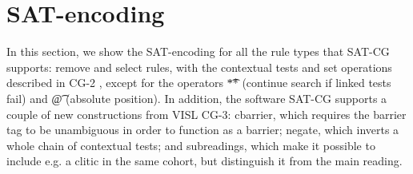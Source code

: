 \def\sobre{\text{\em sobre}}
\def\una{\text{\em una}}
\def\aproximacion{\text{ \em aproximaci\'{o}n}}
\def\mas{\text{\em m\'{a}s}}
\def\cientifica{\text{\em cient\'{\i}fica}}


\def\vPrsPThree{\text{\sc PrsP3}}
\def\vPrsPOne{\text{\sc PrsP1}}
\def\vImpPThree{\text{\sc ImpP3}}
\def\adj{{\text{\sc Adj}}}
\def\adv{{\text{\sc Adv}}}
\def\n{\text{\sc N}}
\def\pr{{\text{\sc Pr}}}
\def\prn{{\text{\sc Prn}}}
\def\det{{\text{\sc Det}}}
\def\notDet{{\neg \text{\sc Det}}}
\def\any{{\text{Any}}}


\def\sobrePr{\sobre_\pr}
\def\sobreN{\sobre_\n}

\def\unaNotDet{\una_\notDet}
\def\unaAny{\una_\any}
\def\unaPrn{\una_\prn}
\def\unaDet{\una_\det}
\def\unaPrsPThree{\una_\vPrsPThree}
\def\unaPrsPOne{\una_\vPrsPOne}
\def\unaImp{\una_\vImpPThree}
\def\aproximacionN{\aproximacion_\n}
\def\masAdv{\mas_\adv}
\def\masAdj{\mas_\adj}
\def\cientificaAdj{\cientifica_\adj}
\def\cientificaN{\cientifica_\n}


\def\newVar{\text{}} %

\def\cgrule#1{\noindent {\bf  #1 }}
\def\eqdef{\Coloneqq}
\def\impl{\quad\Longrightarrow\quad}

\def\ob#1{\overbrace{ #1 \rule{0pt}{2ex}}}





\section{SAT-encoding}
\label{sec:encoding}

\noindent In this section, we show the SAT-encoding for all the rule types that
SAT-CG supports:
{\sc remove} and {\sc select} rules, with the contextual tests and set operations described in CG-2 \cite{tapanainen1996}, except for the operators \t{**} (continue search if linked tests fail) and \t{@} (absolute position). In addition, the software SAT-CG supports a couple of new constructions from VISL CG-3: {\sc cbarrier}, which requires the barrier tag to be unambiguous in order to function as a barrier;
{\sc negate}, which inverts a whole chain of contextual tests; and subreadings, which make it possible to include e.g. a clitic in the same cohort, but distinguish it from the main reading.

